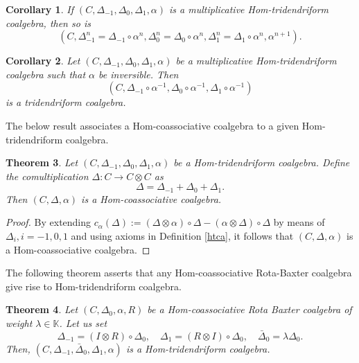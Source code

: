 \documentclass{article}
\newtheorem{thm}{Theorem}[section]
\newtheorem{cor}[thm]{Corollary}
\theoremstyle{definition}
\theoremstyle{remark}
\numberwithin{equation}{section}
\begin{document}
\begin{cor}
 If $(C, \Delta_{-1}, \Delta_0, \Delta_1, \alpha)$ is a multiplicative Hom-tridendriform coalgebra, then so is
$$(C, \Delta^n_{-1}=\Delta_{-1}\circ\alpha^n, \Delta^n_0=\Delta_0\circ\alpha^n, \Delta^n_1=\Delta_1\circ\alpha^n, \alpha^{n+1}).$$
 \end{cor}
\begin{cor}
 Let $(C, \Delta_{-1}, \Delta_0, \Delta_1, \alpha)$ be a multiplicative Hom-tridendriform coalgebra such that $\alpha$ be inversible.
 Then 
 $$(C, \Delta_{-1}\circ\alpha^{-1}, \Delta_0\circ\alpha^{-1}, \Delta_1\circ\alpha^{-1})$$ 
 is a tridendriform coalgebra.
 \end{cor}
 The below result associates a Hom-coassociative coalgebra to a given Hom-tridendriform coalgebra.
 \begin{thm}
 Let $(C, \Delta_{-1}, \Delta_0, \Delta_1, \alpha)$  be a Hom-tridendriform coalgebra. Define the comultiplication
 $\Delta : C\rightarrow C\otimes C$ as
 $$\Delta=\Delta_{-1}+\Delta_0+\Delta_1.$$
 Then $(C, \Delta, \alpha)$ is a Hom-coassociative coalgebra.
\end{thm}
 \begin{proof}
  By extending $c_\alpha(\Delta):=(\Delta\otimes\alpha)\circ\Delta-(\alpha\otimes\Delta)\circ\Delta$ by means of $\Delta_i, i=-1, 0, 1$ 
 and using axioms in Definition \ref{htca}, it follows that $(C, \Delta, \alpha)$ is a Hom-coassociative coalgebra.
 \end{proof}
 The following theorem asserts that any Hom-coassociative Rota-Baxter coalgebra give rise to Hom-tridendriform coalgebra.
\begin{thm}
  Let $(C, \Delta_0, \alpha, R)$ be a Hom-coassociative Rota Baxter coalgebra of weight $\lambda\in\mathbb{K}$.
 Let us set 
 $$ \Delta_{-1}=(I\otimes R)\circ\Delta_{0},\quad \Delta_{1}=(R\otimes I)\circ\Delta_0,\quad \bar{\Delta}_0=\lambda\Delta_0.$$
 Then, $(C, \Delta_{-1}, \bar{\Delta}_0, \Delta_1, \alpha)$ is a Hom-tridendriform coalgebra.
 \end{thm}
\end{document}
